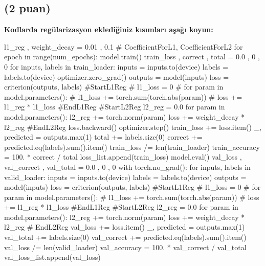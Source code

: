 \documentclass[11pt]{article}
\begin{document}
\subsection{(2 puan)} \textbf{Kodlarda regülarizasyon eklediğiniz kısımları aşağı koyun:} 

\begin{python}
l1_reg , weight_decay = 0.01 , 0.1 # CoefficientForL1,  CoefficientForL2
    for epoch in range(num_epochs):
        model.train()
        train_loss , correct , total = 0.0 , 0 , 0
        for inputs, labels in train_loader:
            inputs = inputs.to(device)
            labels = labels.to(device)
            optimizer.zero_grad()
            outputs = model(inputs)
            loss = criterion(outputs, labels)
            #StartL1Reg
            # l1_loss = 0
            # for param in model.parameters():
            #     l1_loss += torch.sum(torch.abs(param))
            # loss += l1_reg * l1_loss
            #EndL1Reg
            #StartL2Reg
            l2_reg = 0.0
            for param in model.parameters():
                l2_reg += torch.norm(param)
            loss += weight_decay * l2_reg
            #EndL2Reg
            loss.backward()
            optimizer.step()
            train_loss += loss.item()
            _, predicted = outputs.max(1)
            total += labels.size(0)
            correct += predicted.eq(labels).sum().item()
        train_loss /= len(train_loader)
        train_accuracy = 100. * correct / total
        loss_list.append(train_loss)
        model.eval()
        val_loss , val_correct , val_total = 0.0 , 0 , 0
        with torch.no_grad():
            for inputs, labels in valid_loader:
                inputs = inputs.to(device)
                labels = labels.to(device)
                outputs = model(inputs)
                loss = criterion(outputs, labels)
                #StartL1Reg
                # l1_loss = 0
                # for param in model.parameters():
                #     l1_loss += torch.sum(torch.abs(param))
                # loss += l1_reg * l1_loss
                #EndL1Reg
                #StartL2Reg
                l2_reg = 0.0
                for param in model.parameters():
                    l2_reg += torch.norm(param)
                loss += weight_decay * l2_reg
                # EndL2Reg
                val_loss += loss.item()
                _, predicted = outputs.max(1)
                val_total += labels.size(0)
                val_correct += predicted.eq(labels).sum().item()
        val_loss /= len(valid_loader)
        val_accuracy = 100. * val_correct / val_total
        val_loss_list.append(val_loss)
\end{python}
\end{document}
